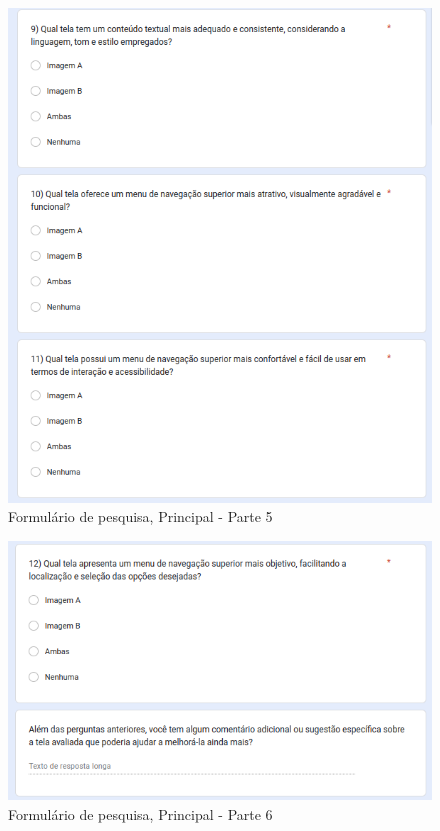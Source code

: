 \begin{figure}[!h]
	\begin{center}
	    \includegraphics[scale=0.6]{figs/Form/17.png}
	\end{center}
	\caption{\label{AP_PP05}Formulário de pesquisa, Principal - Parte 5}
\end{figure}

\newpage

\begin{figure}[!h]
	\begin{center}
	    \includegraphics[scale=0.6]{figs/Form/18.png}
	\end{center}
	\caption{\label{AP_PP06}Formulário de pesquisa, Principal - Parte 6}
\end{figure}

